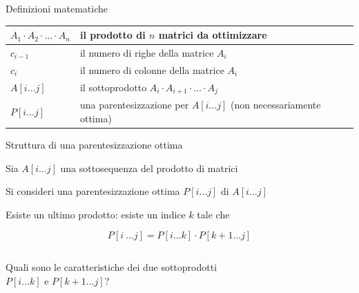 \begin{frame}{Definizioni matematiche}

\begin{tabular}{|P{3cm}|P{8cm}|}
\hline
$A_1 \cdot A_2 \cdot \ldots \cdot A_n$  & il prodotto di $n$ matrici da ottimizzare \\\hline
$c_{i-1}$ & il numero di righe della matrice $A_i$ \\\hline
$c_i$ & il numero di colonne della matrice $A_i$ \\\hline
$A[i \ldots j]$ & il sottoprodotto $A_i \cdot A_{i+1 }\cdot \ldots \cdot A_j$ \\\hline
$P[i \ldots j]$ & una parentesizzazione per $A[i \ldots j]$ \newline(non necessariamente ottima) \\\hline
\end{tabular}
\end{frame}

\begin{frame}{Struttura di una parentesizzazione ottima}
    
\vspace{-6pt}
\begin{myboxtitle}[Osservazioni]
\BIL
\item Sia $A[i \ldots j]$ una sottosequenza del prodotto di matrici
\item Si consideri una parentesizzazione ottima $P[i \ldots j]$ di $A[i \ldots j]$
\item Esiste un \alert{ultimo prodotto}: esiste un indice $k$ tale che 

\[
  P[i\ \ldots j] = P[i \ldots k] \cdot  P[k+1 \ldots j]
\]
\EIL
\end{myboxtitle}

\begin{columns}[T]
\begin{myboxtitle}[Domanda]
Quali sono le caratteristiche dei due sottoprodotti\\ $P[i \ldots k]$ e $P[k+1 \ldots j]$?
\end{myboxtitle}
\vspace{-6pt}
\end{columns}

\end{frame}

